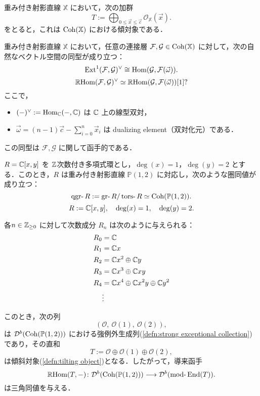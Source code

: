 \begin{thm}\cite{GL87}
重み付き射影直線 $\mathbb{X}$ において，次の加群
\[
T := \bigoplus_{0 \le \vec{x} \le \vec{c}} \mathcal{O}_{\mathbb{X}}(\vec{x}).
\]
をとると，これは $\operatorname{\mathrm{Coh}}(\mathbb{X})$ における傾対象である．
\end{thm}

\begin{thm}\cite{GL87}
重み付き射影直線 $\mathbb{X}$ において，任意の連接層 $\mathcal{F}, \mathcal{G} \in \operatorname{\mathrm{Coh}}(\mathbb{X})$ に対して，次の自然なベクトル空間の同型が成り立つ：
\[
\operatorname{\mathrm{Ext}}^1(\mathcal{F}, \mathcal{G})^\vee \cong \operatorname{\mathrm{Hom}}(\mathcal{G}, \mathcal{F}(\vec{\omega})).
\]
\[
\operatorname{\mathbb{R}\mathrm{Hom}}({\mathcal F},{\mathcal G})^\vee \simeq \operatorname{\mathbb{R}\mathrm{Hom}}({\mathcal G},{\mathcal F}(\vec{\omega}))[1]?\]
ここで，
\begin{itemize}
	\item $(-)^\vee := \operatorname{\mathrm{Hom}}_{{\mathbb C}}(-, {\mathbb C})$ は ${\mathbb C}$ 上の線型双対，
  \item $\vec{\omega} = (n - 1)\vec{c} - \sum_{i=0}^n \vec{x}_i$ は dualizing element（双対化元）である．
\end{itemize}
この同型は $\mathcal{F}, \mathcal{G}$ に関して函手的である．
\end{thm}

\begin{exmp}
$R = {\mathbb C}[x, y]$ を ${\mathbb Z}$次数付き多項式環とし，$\deg(x) = 1$，$\deg(y) = 2$ とする．このとき，$R$ は重み付き射影直線 $\mathbb{P}(1,2)$ に対応し，次のような圏同値が成り立つ：
\[
\qgr R := \gr R / \tors R \simeq \Coh(\mathbb{P}(1,2)).
\]
\[
R := {\mathbb C}[x, y], \quad \deg(x) = 1,\quad \deg(y) = 2.
\]

各\(n \in {\mathbb Z}_{\ge 0}\) に対して次数成分 \(R_n\) は次のように与えられる：
\[
\begin{aligned}
R_0 &= {\mathbb C} \\
R_1 &= {\mathbb C} x \\
R_2 &= {\mathbb C} x^2 \oplus {\mathbb C} y \\
R_3 &= {\mathbb C} x^3 \oplus {\mathbb C} x y \\
R_4 &= {\mathbb C} x^4 \oplus {\mathbb C} x^2 y \oplus {\mathbb C} y^2 \\
&\vdots 
\end{aligned}
\]

このとき，次の列
\[
(\mathcal{O},\ \mathcal{O}(1),\ \mathcal{O}(2)),
\]
は \({\mathcal D}^b(\operatorname{\mathrm{Coh}}(\mathbb{P}(1,2)))\) における強例外生成列(\ref{defn:strong exceptional collection})であり，その直和
\[
T := \mathcal{O} \oplus \mathcal{O}(1) \oplus \mathcal{O}(2),
\]
は傾斜対象(\ref{defn:tilting object})となる．したがって，導来函手
\[
\RHom(T, -) \colon \D^b(\Coh(\mathbb{P}(1,2))) \longrightarrow \D^b(\mod \End(T)).
\]
は三角同値を与える．
\end{exmp}

